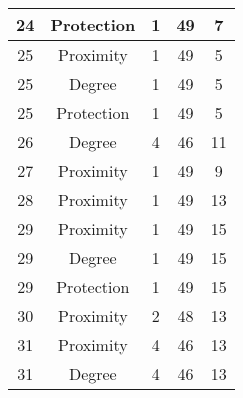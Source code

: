\documentclass[results.tex]{subfiles}
\begin{document}
\begin{center}
\begin{tabular}{| c || c | c | c | c |}
            \hline
            24                      & Protection                   & 1                      & 49                      & 7                    \\
            \hline
            25                      & Proximity                    & 1                      & 49                      & 5                    \\
            \hline
            25                      & Degree                       & 1                      & 49                      & 5                    \\
            \hline
            25                      & Protection                   & 1                      & 49                      & 5                    \\
            \hline
            26                      & Degree                       & 4                      & 46                      & 11                   \\
            \hline
            27                      & Proximity                    & 1                      & 49                      & 9                    \\
            \hline
            28                      & Proximity                    & 1                      & 49                      & 13                   \\
            \hline
            29                      & Proximity                    & 1                      & 49                      & 15                   \\
            \hline
            29                      & Degree                       & 1                      & 49                      & 15                   \\
            \hline
            29                      & Protection                   & 1                      & 49                      & 15                   \\
            \hline
            30                      & Proximity                    & 2                      & 48                      & 13                   \\
            \hline
            31                      & Proximity                    & 4                      & 46                      & 13                   \\
            \hline
            31                      & Degree                       & 4                      & 46                      & 13                   \\

\end{tabular}
\end{center}
\end{document}
